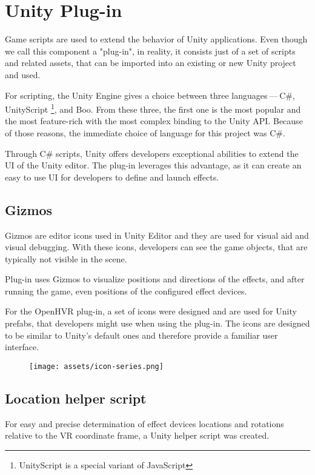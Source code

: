 \hypertarget{x-unity-plug-in}{\section{Unity Plug-in}}
Game scripts are used to extend the behavior of Unity applications. Even though
we call this component a "plug-in", in reality, it consists just of a
set of scripts and related assets, that can be imported into an existing
or new Unity project and used.


For scripting, the Unity Engine gives a choice between three languages — C\#, UnityScript \footnote{UnityScript is a special variant of JavaScript}, and
Boo. From these three, the first one is the most popular and the most
feature-rich with the most complex binding to the Unity API. \hyperlink{unityblog}{}
Because of those reasons, the immediate choice of language for this
project was C\#.


Through C\# scripts, Unity offers developers exceptional abilities to extend
the UI of the Unity editor. The plug-in leverages this advantage, as it can
create an easy to use UI for developers to define and launch effects.


\hypertarget{x-gizmos}{\subsection{Gizmos}}
Gizmos are editor icons used in Unity Editor and they are used for
visual aid and visual debugging. \hyperlink{gizmos}{}
With these icons, developers can see the game objects, that are
typically not visible in the scene.


Plug-in uses Gizmos to visualize positions and directions of the
effects, and after running the game, even positions of the configured
effect devices.


For the OpenHVR plug-in, a set of icons were designed and are used for
Unity prefabs, that developers might use when using the plug-in. The icons
are designed to be similar to Unity’s default ones and therefore provide
a familiar user interface.


\begin{figure}[h]{}
\centering\texttt{[image: assets/icon-series.png]}
\caption{}

\end{figure}

\hypertarget{x-location-helper-script}{\subsection{Location helper script}}
For easy and precise determination of effect devices locations and rotations
relative to the VR coordinate frame, a Unity helper script was created.


